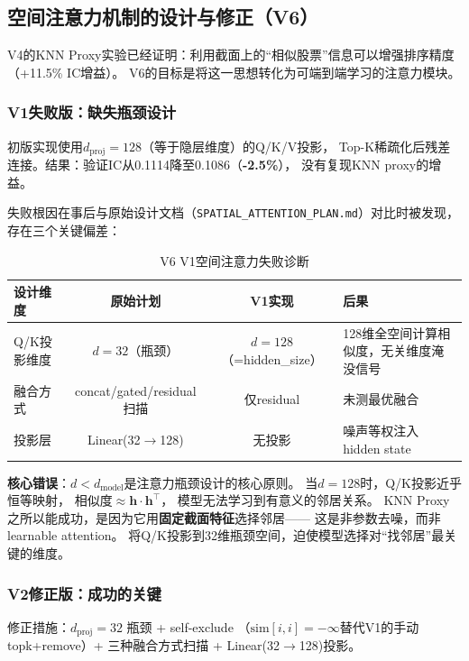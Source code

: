 \documentclass[12pt,a4paper]{ctexart}
\begin{document}
\subsection{空间注意力机制的设计与修正（V6）}

V4的KNN Proxy实验已经证明：利用截面上的“相似股票”信息可以增强排序精度（+11.5\% IC增益）。
V6的目标是将这一思想转化为可端到端学习的注意力模块。

\subsubsection{V1失败版：缺失瓶颈设计}

初版实现使用$d_{\text{proj}}=128$（等于隐层维度）的Q/K/V投影，
Top-K稀疏化后残差连接。结果：验证IC从0.1114降至0.1086（\textbf{-2.5\%}），
没有复现KNN proxy的增益。

失败根因在事后与原始设计文档（\texttt{SPATIAL\_ATTENTION\_PLAN.md}）对比时被发现，
存在三个关键偏差：

\begin{table}[htbp]
\centering
\caption{V6 V1空间注意力失败诊断}
\label{tab:v6_v1_diagnosis}
\begin{tabular}{lccp{4cm}}
\toprule
设计维度 & 原始计划 & V1实现 & 后果 \\
\midrule
Q/K投影维度 & \textbf{$d{=}32$}（瓶颈） & $d{=}128$（=hidden\_size） & 128维全空间计算相似度，无关维度淹没信号 \\
融合方式 & concat/gated/residual扫描 & 仅residual & 未测最优融合 \\
投影层 & Linear(32$\to$128) & 无投影 & 噪声等权注入hidden state \\
\bottomrule
\end{tabular}
\end{table}

\textbf{核心错误}：$d < d_{\text{model}}$是注意力瓶颈设计的核心原则。
当$d=128$时，Q/K投影近乎恒等映射，
相似度$\approx \mathbf{h} \cdot \mathbf{h}^\top$，
模型无法学习到有意义的邻居关系。
KNN Proxy之所以能成功，是因为它用\textbf{固定截面特征}选择邻居——
这是非参数去噪，而非learnable attention。
将Q/K投影到32维瓶颈空间，迫使模型选择对“找邻居”最关键的维度。

\subsubsection{V2修正版：成功的关键}

修正措施：$d_{\text{proj}}=32$ 瓶颈 + self-exclude
（$\text{sim}[i,i]=-\infty$替代V1的手动topk+remove）+ 三种融合方式扫描 +
Linear(32$\to$128)投影。
\end{document}

